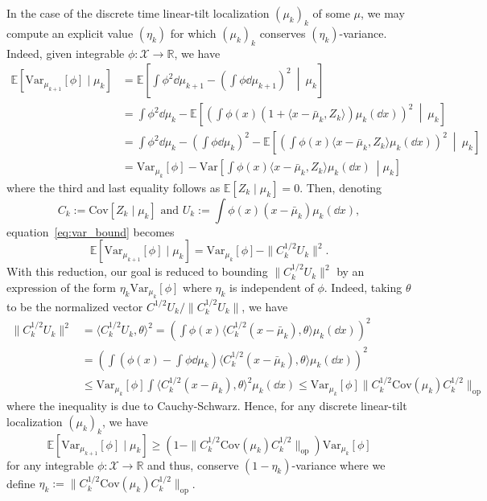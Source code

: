 In the case of the discrete time linear-tilt localization \((\mu_k)_k\) of some \(\mu\), we may compute 
an explicit value \((\eta_k)\) for which \((\mu_k)_k\) conserves \((\eta_k)\)-variance. Indeed, 
given integrable \(\phi : \mathcal{X} \to \mathbb{R}\), we have
\begin{equation}\label{eq:var_bound}
  \begin{split}
    \mathbb{E}[\text{Var}_{\mu_{k + 1}}[\phi] \mid \mu_k] 
    & = \mathbb{E}\left[\int\phi^2 \dd \mu_{k + 1} - \left(\int \phi \dd \mu_{k + 1}\right)^2\ \middle\vert\ \mu_k \right]\\
    & = \int \phi^2 \dd \mu_k - \mathbb{E}\left[\left(\int \phi(x) 
          (1 + \langle x - \bar{\mu}_k, Z_k\rangle)\mu_k(\dd x)\right)^2\ \middle\vert\ \mu_k\right]\\
    & = \int \phi^2 \dd \mu_k - \left(\int \phi \dd \mu_k\right)^2 -
          \mathbb{E}\left[\left(\int \phi(x) \langle x - \bar{\mu}_k, Z_k\rangle\mu_k(\dd x)\right)^2\ \middle\vert\ \mu_k\right]\\
    & = \text{Var}_{\mu_k}[\phi] - 
          \text{Var}\left[\int \phi(x) \langle x - \bar{\mu}_k, Z_k\rangle\mu_k(\dd x)\ \middle\vert \mu_k\right]
  \end{split}
\end{equation}
where the third and last equality follows as \(\mathbb{E}[Z_k \mid \mu_k] = 0\). Then, denoting 
\[C_k := \text{Cov}[Z_k \mid \mu_k] \text{ and } U_k := \int \phi(x)(x - \bar{\mu}_k) \mu_k(\dd x),\]
equation~\eqref{eq:var_bound} becomes
\[\mathbb{E}[\text{Var}_{\mu_{k + 1}}[\phi] \mid \mu_k] = \text{Var}_{\mu_k}[\phi] - \|C_k^{1 / 2}U_k\|^2.\]
With this reduction, our goal is reduced to bounding \(\|C_k^{1 / 2}U_k\|^2\) by an expression of 
the form \(\eta_k \text{Var}_{\mu_k}[\phi]\) where \(\eta_k\) is independent of \(\phi\). Indeed, 
taking \(\theta\) to be the normalized vector \(C^{1/ 2}U_k / \|C_k^{1 / 2}U_k\|\), we have
\begin{align*}
  \|C_k^{1 / 2} U_k\|^2 & = \langle C_k^{1 / 2} U_k, \theta\rangle^2 
    = \left(\int \phi(x)\langle C_k^{1 / 2}(x - \bar{\mu}_k), \theta \rangle \mu_k(\dd x)\right)^2\\
  & = \left(\int \left(\phi(x) - \int \phi \dd\mu_k\right) \langle C_k^{1 / 2}(x - \bar{\mu}_k), \theta \rangle \mu_k(\dd x)\right)^2\\
  & \le \text{Var}_{\mu_k}[\phi]\int \langle C_k^{1 / 2}(x - \bar{\mu}_k), \theta \rangle^2 \mu_k(\dd x)
    \le \text{Var}_{\mu_k}[\phi]\|C_k^{1/ 2}\text{Cov}(\mu_k) C_k^{1 / 2}\|_{\text{op}}
\end{align*}
where the inequality is due to Cauchy-Schwarz. Hence, for any discrete linear-tilt 
localization \((\mu_k)_k\), we have
\begin{equation}\label{eq:linear-tilt_ACV}
  \mathbb{E}[\text{Var}_{\mu_{k + 1}}[\phi] \mid \mu_k] \ge 
    (1 - \|C_k^{1 / 2}\text{Cov}(\mu_k)C_k^{1 / 2}\|_{\text{op}})\text{Var}_{\mu_k}[\phi]
\end{equation}
for any integrable \(\phi : \mathcal{X} \to \mathbb{R}\) and thus, conserve \((1 - \eta_k)\)-variance 
where we define \(\eta_k := \|C_k^{1 / 2}\text{Cov}(\mu_k)C_k^{1 / 2}\|_{\text{op}}\). 

